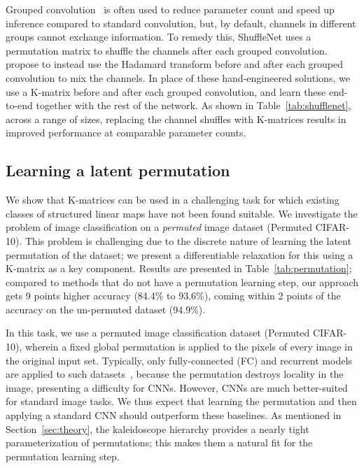 Grouped convolution~\citep{krizhevsky2012imagenet} is often used to reduce parameter count and speed up inference compared to standard convolution, but, by default, channels in different groups cannot exchange information. To remedy this, ShuffleNet uses a permutation matrix to shuffle the channels after each grouped convolution.
\citet{zhao2019building} propose to instead use the Hadamard transform before and after each grouped convolution to mix the channels. In place of these hand-engineered solutions, we use a K-matrix before and after each grouped convolution, and learn these end-to-end together with the rest of the network. As shown in Table~\ref{tab:shufflenet}, across a range of sizes, replacing the channel shuffles with K-matrices results in improved performance at comparable parameter counts.

\subsection{Learning a latent permutation}
\label{sec:learning-permutation}
We show that K-matrices can be used in a challenging task for which existing classes of structured linear maps have not been found suitable. We investigate the problem of image classification on a \textit{permuted} image dataset (Permuted CIFAR-10). This problem is challenging due to the discrete nature of learning the latent permutation of the dataset; we present a differentiable relaxation for this using a K-matrix as a key component. Results are presented in Table~\ref{tab:permutation}; 
compared to methods that do not have a permutation learning step, our approach gets 9 points higher accuracy (84.4\% to 93.6\%), coming within 2 points of the accuracy on the un-permuted dataset (94.9\%).

In this task, we use a permuted image classification dataset (Permuted CIFAR-10), wherein a fixed global permutation is applied to the pixels of every image in the original input set. Typically, only fully-connected (FC) and recurrent models are applied to such datasets~\citep{le2015simple}, because the permutation destroys locality in the image, presenting a difficulty for CNNs. However, CNNs are much better-suited for standard image tasks. We thus expect that learning the permutation and then applying a standard CNN should outperform these baselines. As mentioned in Section~\ref{sec:theory}, the kaleidoscope hierarchy provides a nearly tight parameterization of permutations; this makes them a natural fit for the permutation learning step.

